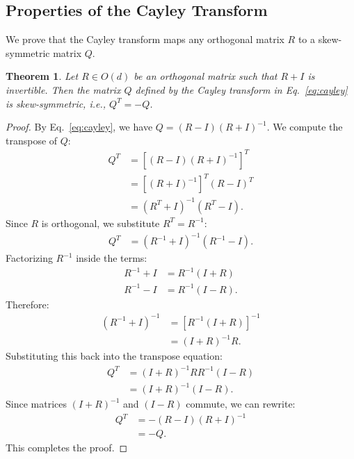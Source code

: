 \documentclass{article}
\theoremstyle{plain}
\newtheorem{theorem}{Theorem}[section]
\theoremstyle{definition}
\theoremstyle{remark}
\begin{document}
\subsection{Properties of the Cayley Transform}
\label{subsec:cayley_proof}

We prove that the Cayley transform maps any orthogonal matrix $R$ to a skew-symmetric matrix $Q$.

\begin{theorem}
Let $R \in O(d)$ be an orthogonal matrix such that $R + I$ is invertible. Then the matrix $Q$ defined by the Cayley transform in Eq.~\eqref{eq:cayley} is skew-symmetric, i.e., $Q^T = -Q$.
\end{theorem}

\begin{proof}
By Eq.~\eqref{eq:cayley}, we have $Q = (R - I)(R + I)^{-1}$. We compute the transpose of $Q$:
\begin{align}
Q^T &= \left[ (R - I)(R + I)^{-1} \right]^T \nonumber \\
&= \left[ (R + I)^{-1} \right]^T (R - I)^T \nonumber \\
&= \left( R^T + I \right)^{-1} \left( R^T - I \right).
\end{align}
Since $R$ is orthogonal, we substitute $R^T = R^{-1}$:
\begin{align}
Q^T &= \left( R^{-1} + I \right)^{-1} \left( R^{-1} - I \right).
\end{align}
Factorizing $R^{-1}$ inside the terms:
\begin{align}
R^{-1} + I &= R^{-1}(I + R) \nonumber \\
R^{-1} - I &= R^{-1}(I - R).
\end{align}
Therefore:
\begin{align}
\left( R^{-1} + I \right)^{-1} &= \left[ R^{-1}(I + R) \right]^{-1} \nonumber \\
&= (I + R)^{-1} R.
\end{align}
Substituting this back into the transpose equation:
\begin{align}
Q^T &= (I + R)^{-1} R R^{-1} (I - R) \nonumber \\
&= (I + R)^{-1} (I - R).
\end{align}
Since matrices $(I + R)^{-1}$ and $(I - R)$ commute, we can rewrite:
\begin{align}
Q^T &= - (R - I)(R + I)^{-1} \nonumber \\
&= - Q.
\end{align}
This completes the proof.
\end{proof}
\end{document}
